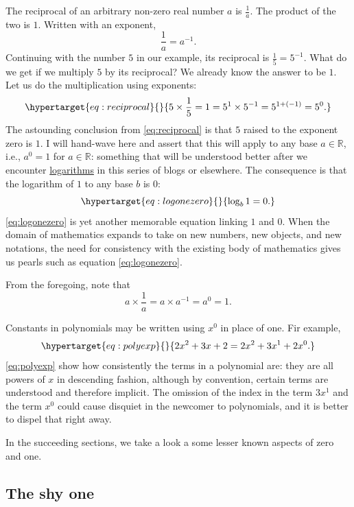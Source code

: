 \documentclass[
  a4paper,
]{article}
\begin{document}
The reciprocal of an arbitrary non-zero real number \(a\) is
\(\frac{1}{a}\). The product of the two is \(1\). Written with an
exponent, \[
\frac{1}{a} = a^{-1}.
\] Continuing with the number \(5\) in our example, its reciprocal is
\(\frac{1}{5} = 5^{-1}\). What do we get if we multiply \(5\) by its
reciprocal? We already know the answer to be \(1\). Let us do the
multiplication using exponents:
\begin{equation}\protect\hypertarget{eq:reciprocal}{}{
5 \times \frac{1}{5} = 1 = 5^{1} \times 5^{-1} = 5^{1+(-1)} = 5^{0}.
}\label{eq:reciprocal}\end{equation} The astounding conclusion from
\cref{eq:reciprocal} is that \(5\) raised to the exponent zero is
\({1}\). I will hand-wave here and assert that this will apply to any
base \(a \in \mathbb{R}\), i.e., \(a^0 = 1\) for \(a \in \mathbb{R}\):
something that will be understood better after we encounter
\href{https://www.britannica.com/science/logarithm}{logarithms} in this
series of blogs or elsewhere. The consequence is that the logarithm of
\(1\) to any base \(b\) is \(0\):
\begin{equation}\protect\hypertarget{eq:logonezero}{}{
\log_{b}1 = 0.
}\label{eq:logonezero}\end{equation} \cref{eq:logonezero} is yet another
memorable equation linking \(1\) and \(0\). When the domain of
mathematics expands to take on new numbers, new objects, and new
notations, the need for consistency with the existing body of
mathematics gives us pearls such as equation \cref{eq:logonezero}.

From the foregoing, note that \[
a \times \frac{1}{a} = a \times a^{-1} = a^0 = 1.
\]

Constants in polynomials may be written using \(x^0\) in place of one.
Fir example, \begin{equation}\protect\hypertarget{eq:polyexp}{}{
2x^2 + 3x + 2 = 2x^2 + 3x^1 + 2x^0.
}\label{eq:polyexp}\end{equation} \cref{eq:polyexp} show how
consistently the terms in a polynomial are: they are all powers of \(x\)
in descending fashion, although by convention, certain terms are
understood and therefore implicit. The omission of the index in the term
\(3x^1\) and the term \(x^0\) could cause disquiet in the newcomer to
polynomials, and it is better to dispel that right away.

In the succeeding sections, we take a look a some lesser known aspects
of zero and one.

\hypertarget{the-shy-one}{%
\subsection{The shy one}\label{the-shy-one}}
\end{document}
